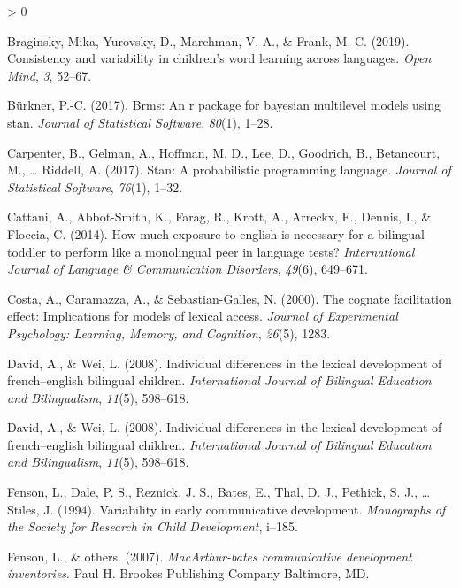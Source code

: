 \documentclass[
  english,
  man,man,floatsintext]{apa6}
\newlength{\cslhangindent}
\newenvironment{CSLReferences}[2] %
 {%
  \setlength{\parindent}{0pt}
  \ifodd #1 \everypar{\setlength{\hangindent}{\cslhangindent}}\ignorespaces\fi
  \ifnum #2 > 0
  \setlength{\parskip}{#2\baselineskip}
  \fi
 }%
 {}
\begin{document}
\begin{CSLReferences}{1}{0}
\leavevmode\hypertarget{ref-braginsky2019consistency}{}%
Braginsky, Mika, Yurovsky, D., Marchman, V. A., \& Frank, M. C. (2019). Consistency and variability in children's word learning across languages. \emph{Open Mind}, \emph{3}, 52--67.

\leavevmode\hypertarget{ref-burkner2017brms}{}%
Bürkner, P.-C. (2017). Brms: An r package for bayesian multilevel models using stan. \emph{Journal of Statistical Software}, \emph{80}(1), 1--28.

\leavevmode\hypertarget{ref-carpenter2017stan}{}%
Carpenter, B., Gelman, A., Hoffman, M. D., Lee, D., Goodrich, B., Betancourt, M., \ldots{} Riddell, A. (2017). Stan: A probabilistic programming language. \emph{Journal of Statistical Software}, \emph{76}(1), 1--32.

\leavevmode\hypertarget{ref-cattani2014much}{}%
Cattani, A., Abbot-Smith, K., Farag, R., Krott, A., Arreckx, F., Dennis, I., \& Floccia, C. (2014). How much exposure to english is necessary for a bilingual toddler to perform like a monolingual peer in language tests? \emph{International Journal of Language \& Communication Disorders}, \emph{49}(6), 649--671.

\leavevmode\hypertarget{ref-costa2000cognate}{}%
Costa, A., Caramazza, A., \& Sebastian-Galles, N. (2000). The cognate facilitation effect: Implications for models of lexical access. \emph{Journal of Experimental Psychology: Learning, Memory, and Cognition}, \emph{26}(5), 1283.

\leavevmode\hypertarget{ref-david2008individual}{}%
David, A., \& Wei, L. (2008). Individual differences in the lexical development of french--english bilingual children. \emph{International Journal of Bilingual Education and Bilingualism}, \emph{11}(5), 598--618.

\leavevmode\hypertarget{ref-david2008individual}{}%
David, A., \& Wei, L. (2008). Individual differences in the lexical development of french--english bilingual children. \emph{International Journal of Bilingual Education and Bilingualism}, \emph{11}(5), 598--618.

\leavevmode\hypertarget{ref-fenson1994variability}{}%
Fenson, L., Dale, P. S., Reznick, J. S., Bates, E., Thal, D. J., Pethick, S. J., \ldots{} Stiles, J. (1994). Variability in early communicative development. \emph{Monographs of the Society for Research in Child Development}, i--185.

\leavevmode\hypertarget{ref-fenson2007macarthur}{}%
Fenson, L., \& others. (2007). \emph{MacArthur-bates communicative development inventories}. Paul H. Brookes Publishing Company Baltimore, MD.


\end{CSLReferences}
\end{document}

